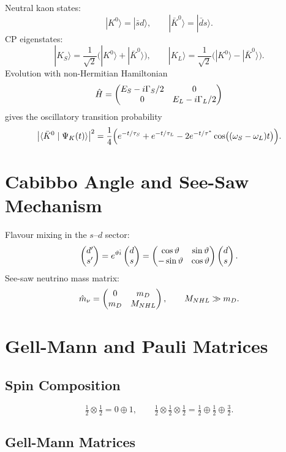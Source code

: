 Neutral kaon states:
\[
|K^{0}\rangle = |\bar{s}d\rangle,\qquad
|\bar{K}^{0}\rangle = |\bar{d}s\rangle.
\]
CP eigenstates:
\[
|K_{S}\rangle = \frac{1}{\sqrt{2}}\bigl(|K^{0}\rangle + |\bar{K}^{0}\rangle\bigr),\qquad
|K_{L}\rangle = \frac{1}{\sqrt{2}}\bigl(|K^{0}\rangle - |\bar{K}^{0}\rangle\bigr).
\]
Evolution with non-Hermitian Hamiltonian
\[
\hat{H} = \begin{pmatrix}E_{S}-i\Gamma_{S}/2 & 0 \\ 0 & E_{L}-i\Gamma_{L}/2\end{pmatrix}
\]
gives the oscillatory transition probability
\[
\bigl|\langle\bar{K}^{0}\mid\Psi_{K}(t)\rangle\bigr|^{2}
= \frac{1}{4}\Bigl(e^{-t/\tau_{S}} + e^{-t/\tau_{L}}
- 2e^{-t/\tau^{*}}\cos\bigl((\omega_{S}-\omega_{L})t\bigr)\Bigr).
\]

\section{Cabibbo Angle and See-Saw Mechanism}
\label{sec:1.4}

Flavour mixing in the $s$--$d$ sector:
\[
\begin{pmatrix}d' \\ s'\end{pmatrix} = e^{\vartheta\hat{i}}\begin{pmatrix}d \\ s\end{pmatrix}
= \begin{pmatrix}\cos\vartheta & \sin\vartheta \\ -\sin\vartheta & \cos\vartheta\end{pmatrix}\begin{pmatrix}d \\ s\end{pmatrix}.
\]
See-saw neutrino mass matrix:
\[
\hat{m}_{\nu} = \begin{pmatrix}0 & m_{D} \\ m_{D} & M_{NHL}\end{pmatrix},\qquad M_{NHL}\gg m_{D}.
\]

\section{Gell-Mann and Pauli Matrices}
\label{sec:1.5}

\subsection{Spin Composition}

\[
\tfrac{1}{2}\otimes\tfrac{1}{2} = 0\oplus 1,\qquad
\tfrac{1}{2}\otimes\tfrac{1}{2}\otimes\tfrac{1}{2}
= \tfrac{1}{2}\oplus\tfrac{1}{2}\oplus\tfrac{3}{2}.
\]

\subsection{Gell-Mann Matrices}

